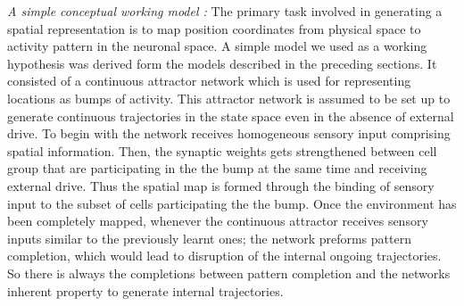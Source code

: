 \emph{A simple conceptual working model : }
The primary task involved in generating a spatial representation is to map position coordinates from physical space to activity pattern in the neuronal space. A simple model we used as a working hypothesis was derived form the models described in the preceding sections. It consisted of a continuous attractor network which is used for representing locations as bumps of activity. This attractor network is assumed to be set up to generate continuous trajectories in the state space even in the absence of external drive. To begin with the network receives homogeneous sensory input comprising spatial information. Then, the synaptic weights gets strengthened between cell group that are participating in the the bump at the same time and receiving external drive. Thus the spatial map is formed through the binding of sensory input to the subset of cells participating the the bump. Once the environment has been completely mapped, whenever the continuous attractor receives sensory inputs similar to the previously learnt ones; the network preforms pattern completion, which would lead to disruption of the internal ongoing trajectories. So there is always the completions between pattern completion and the networks inherent property to generate internal trajectories. 